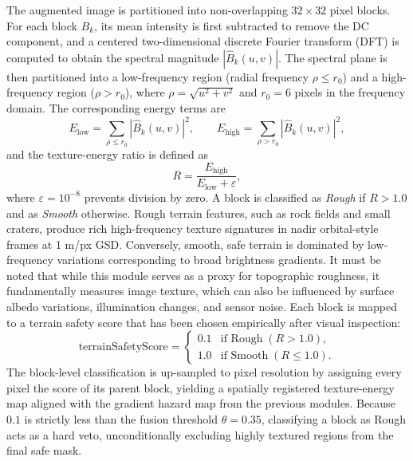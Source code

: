 \documentclass{article}
\begin{document}
The augmented image is partitioned into non-overlapping $32 \times 32$ pixel blocks. For each block $B_k$, its mean intensity is first subtracted to remove the DC component, and a centered two-dimensional discrete Fourier transform (DFT) is computed to obtain the spectral magnitude $|\hat{B}_k(u,v)|$. The spectral plane is then partitioned into a low-frequency region (radial frequency $\rho \leq r_0$) and a high-frequency region ($\rho > r_0$), where $\rho = \sqrt{u^2 + v^2}$ and $r_0 = 6$ pixels in the frequency domain. The corresponding energy terms are
\begin{equation}
    E_{\text{low}}  = \sum_{\rho \leq r_0} |\hat{B}_k(u,v)|^2, \qquad
    E_{\text{high}} = \sum_{\rho >   r_0} |\hat{B}_k(u,v)|^2,
\end{equation}
and the texture-energy ratio is defined as
\begin{equation}
    R = \frac{E_{\text{high}}}{E_{\text{low}} + \varepsilon},
\end{equation}
where $\varepsilon = 10^{-8}$ prevents division by zero. A block is classified as \emph{Rough} if $R > 1.0$ and as \emph{Smooth} otherwise. Rough terrain features, such as rock fields and small craters, produce rich high-frequency texture signatures in nadir orbital-style frames at 1 m/px GSD. Conversely, smooth, safe terrain is dominated by low-frequency variations corresponding to broad brightness gradients. It must be noted that while this module serves as a proxy for topographic roughness, it fundamentally measures image texture, which can also be influenced by surface albedo variations, illumination changes, and sensor noise. Each block is mapped to a terrain safety score that has been chosen empirically after visual inspection:
\begin{equation}
    \text{terrainSafetyScore} =
    \begin{cases}
        0.1 & \text{if Rough} \; (R > 1.0), \\
        1.0 & \text{if Smooth} \; (R \leq 1.0).
    \end{cases}
\end{equation}
The block-level classification is up-sampled to pixel resolution by assigning every pixel the score of its parent block, yielding a spatially registered texture-energy map aligned with the gradient hazard map from the previous modules. Because $0.1$ is strictly less than the fusion threshold $\theta = 0.35$, classifying a block as Rough acts as a hard veto, unconditionally excluding highly textured regions from the final safe mask.
\end{document}
